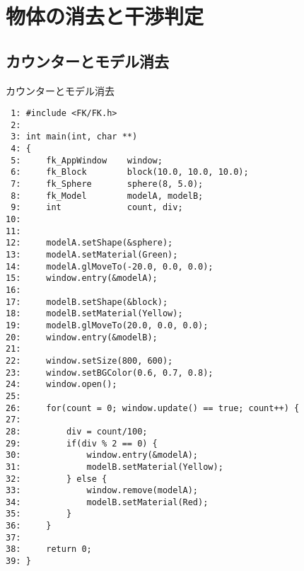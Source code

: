 ﻿\chapter{物体の消去と干渉判定}
\section{カウンターとモデル消去} \label{sec:04-count}
\begin{itembox}[l]{カウンターとモデル消去}
\begin{small}
\begin{verbatim}
 1: #include <FK/FK.h>
 2: 
 3: int main(int, char **)
 4: {
 5:     fk_AppWindow    window;
 6:     fk_Block        block(10.0, 10.0, 10.0);
 7:     fk_Sphere       sphere(8, 5.0);
 8:     fk_Model        modelA, modelB;
 9:     int             count, div;
10: 
11:     
12:     modelA.setShape(&sphere);
13:     modelA.setMaterial(Green);
14:     modelA.glMoveTo(-20.0, 0.0, 0.0);
15:     window.entry(&modelA);
16: 
17:     modelB.setShape(&block);
18:     modelB.setMaterial(Yellow);
19:     modelB.glMoveTo(20.0, 0.0, 0.0);
20:     window.entry(&modelB);
21: 
22:     window.setSize(800, 600);
23:     window.setBGColor(0.6, 0.7, 0.8);
24:     window.open();
25: 
26:     for(count = 0; window.update() == true; count++) {
27: 
28:         div = count/100;
29:         if(div % 2 == 0) {
30:             window.entry(&modelA);
31:             modelB.setMaterial(Yellow);
32:         } else {
33:             window.remove(modelA);
34:             modelB.setMaterial(Red);
35:         }
36:     }
37: 
38:     return 0;
39: }
\end{verbatim}
\end{small}
\end{itembox}
